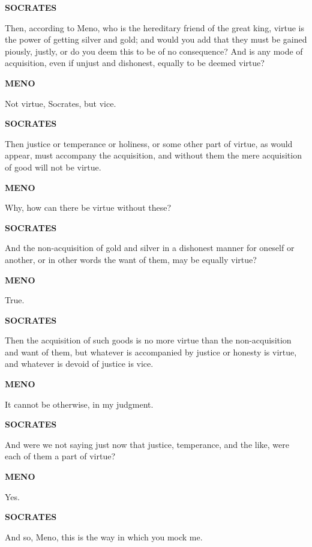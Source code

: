 \documentclass[11pt,letter]{article}
\begin{document}
\par \textbf{SOCRATES}
\par   Then, according to Meno, who is the hereditary friend of the great king, virtue is the power of getting silver and gold; and would you add that they must be gained piously, justly, or do you deem this to be of no consequence? And is any mode of acquisition, even if unjust and dishonest, equally to be deemed virtue?

\par \textbf{MENO}
\par   Not virtue, Socrates, but vice.

\par \textbf{SOCRATES}
\par   Then justice or temperance or holiness, or some other part of virtue, as would appear, must accompany the acquisition, and without them the mere acquisition of good will not be virtue.

\par \textbf{MENO}
\par   Why, how can there be virtue without these?

\par \textbf{SOCRATES}
\par   And the non-acquisition of gold and silver in a dishonest manner for oneself or another, or in other words the want of them, may be equally virtue?

\par \textbf{MENO}
\par   True.

\par \textbf{SOCRATES}
\par   Then the acquisition of such goods is no more virtue than the non-acquisition and want of them, but whatever is accompanied by justice or honesty is virtue, and whatever is devoid of justice is vice.

\par \textbf{MENO}
\par   It cannot be otherwise, in my judgment.

\par \textbf{SOCRATES}
\par   And were we not saying just now that justice, temperance, and the like, were each of them a part of virtue?

\par \textbf{MENO}
\par   Yes.

\par \textbf{SOCRATES}
\par   And so, Meno, this is the way in which you mock me.
\end{document}
